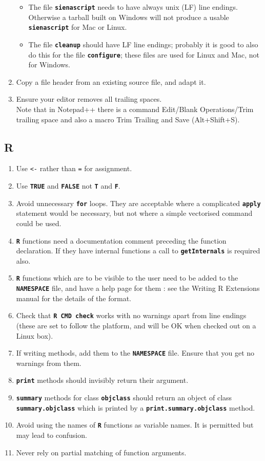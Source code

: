 \documentclass[12pt, a4paper]{article}
\renewcommand{\=}{\,=\,}
\newcommand{\+}{\,+\,}
\newcommand{\sfn}[1]{\textbf{\texttt{#1}}}
\begin{document}
\begin{enumerate}
\begin{itemize}
  \item The file \sfn{sienascript} needs to have always unix (LF) line
  endings. Otherwise a tarball built on Windows will not produce a usable
  \sfn{sienascript} for Mac or Linux.
  \item The file \sfn{cleanup} should have LF line endings;
  probably it is good to also do this for the file \sfn{configure};
  these files are used for Linux and Mac, not for Windows.
  \end{itemize}
\item Copy a file header from an existing source file, and adapt it.
\item Ensure your editor removes all trailing spaces.\\
  Note that in Notepad++ there is a command Edit/Blank Operations/Trim trailing
  space and also a macro Trim Trailing and Save (Alt+Shift+S).
\end{enumerate}
\subsection{R}
\begin{enumerate}
\item Use \verb|<-| rather than \verb|=| for assignment.
\item Use \sfn{TRUE} and \sfn{FALSE} not \sfn{T} and \sfn{F}.
\item Avoid unnecessary \sfn{for} loops. They are acceptable where a complicated
  \sfn{apply} statement would be necessary, but not where a simple vectorised
    command could be used.
  \item \sfn{R} functions need a documentation comment preceding the function
    declaration. If they have internal functions a call to \sfn{getInternals} is
    required also.
  \item \sfn{R} functions which are to be visible to the user need to be added
    to the \sfn{NAMESPACE} file, and have a help page for them : see the Writing
    R Extensions manual for the details of the format.
  \item Check that \sfn{R CMD check} works with no warnings apart from line
    endings (these are set to follow the platform, and will be OK when checked
    out on a Linux box).
  \item If writing methods, add them to the \sfn{NAMESPACE} file. Ensure that
    you get no warnings from them.
  \item \sfn{print} methods should invisibly return their argument.
  \item \sfn{summary} methods for class \sfn{objclass} should return an object
    of class \sfn{summary.objclass} which is printed by a
    \sfn{print.summary.objclass} method.
\item Avoid using the names of \sfn{R} functions as variable names. It is
  permitted but may lead to confusion.
\item Never rely on partial matching of function arguments.
\end{enumerate}
\end{document}
